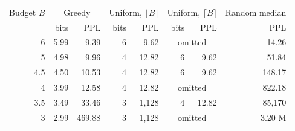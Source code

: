 \begin{tabular}{rrrrrrrr}
\toprule
Budget $B$ & \multicolumn{2}{c}{Greedy} & \multicolumn{2}{c}{Uniform, $\lfloor B \rfloor$} & \multicolumn{2}{c}{Uniform, $\lceil B \rceil$} & Random median \\
 & bits & PPL & bits & PPL & bits & PPL & PPL \\
\midrule
6 & 5.99 & 9.39 & 6 & 9.62 & \multicolumn{2}{c}{omitted} & 14.26 \\
5 & 4.98 & 9.96 & 4 & 12.82 & 6 & 9.62 & 51.84 \\
4.5 & 4.50 & 10.53 & 4 & 12.82 & 6 & 9.62 & 148.17 \\
4 & 3.99 & 12.58 & 4 & 12.82 & \multicolumn{2}{c}{omitted} & 822.18 \\
3.5 & 3.49 & 33.46 & 3 & 1,128 & 4 & 12.82 & 85,170 \\
3 & 2.99 & 469.88 & 3 & 1,128 & \multicolumn{2}{c}{omitted} & 3.20 M \\
\bottomrule
\end{tabular}
